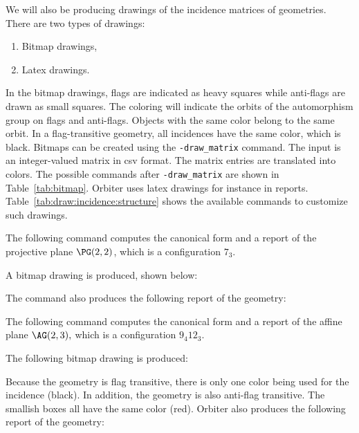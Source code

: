 We will also be producing drawings of the incidence matrices of geometries.
There are two types of drawings:
\begin{enumerate}
\item
Bitmap drawings,
\item
Latex drawings.
\end{enumerate}
In the bitmap drawings, flags are indicated as heavy squares while 
anti-flags are drawn as small squares. 
The coloring will indicate the orbits of the automorphism group on flags and anti-flags. 
Objects with the same color belong to the same orbit. In a flag-transitive geometry, 
all incidences have the same color, which is black. 
Bitmaps can be created using the \verb'-draw_matrix' command. 
The input is an integer-valued matrix in csv format.
The matrix entries are translated into colors.
The possible commands after \verb'-draw_matrix' 
are shown in Table~\ref{tab:bitmap}.
Orbiter uses latex drawings for instance in reports. 
Table~\ref{tab:draw:incidence:structure} 
shows the available commands to customize such drawings.





\bigskip

The following command computes the canonical form  and a report 
of the projective plane $\PG(2,2)$, which is a configuration $7_3.$


A bitmap drawing is produced, shown below:

The command also produces the following report of the geometry:

\bigskip



The following command computes the canonical form  and a report 
of the affine plane $\AG(2,3),$ which is a configuration $9_4 12_3.$


The following bitmap drawing is produced: 

Because the geometry is flag transitive, 
there is only one color being used for the incidence (black). 
In addition, the geometry is also anti-flag transitive. 
The smallish boxes all have the same color (red).
Orbiter also produces the following report of the geometry:


